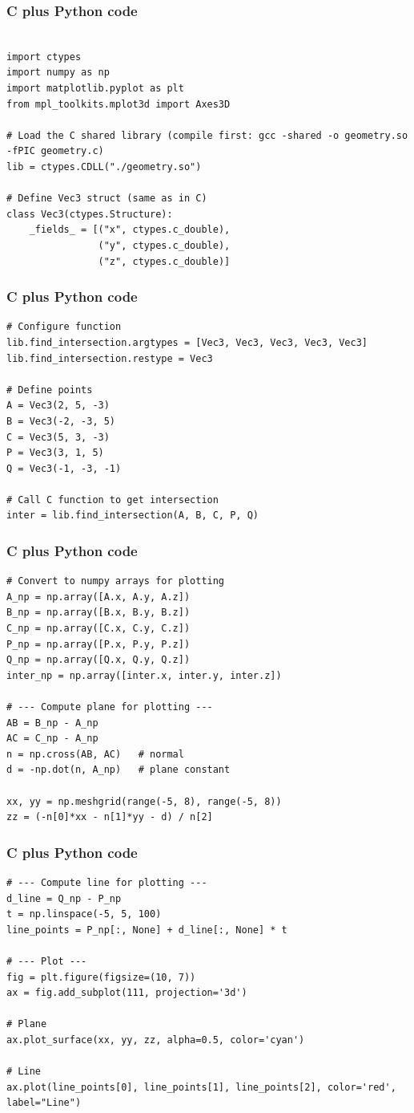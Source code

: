 \documentclass{beamer}
\begin{document}
\begin{frame}[fragile]
    \frametitle{C plus Python code}
    \begin{lstlisting}

import ctypes
import numpy as np
import matplotlib.pyplot as plt
from mpl_toolkits.mplot3d import Axes3D

# Load the C shared library (compile first: gcc -shared -o geometry.so -fPIC geometry.c)
lib = ctypes.CDLL("./geometry.so")

# Define Vec3 struct (same as in C)
class Vec3(ctypes.Structure):
    _fields_ = [("x", ctypes.c_double),
                ("y", ctypes.c_double),
                ("z", ctypes.c_double)]
\end{lstlisting}
 
\end{frame}
\begin{frame}[fragile]
    \frametitle{C plus Python code}
    \begin{lstlisting}
# Configure function
lib.find_intersection.argtypes = [Vec3, Vec3, Vec3, Vec3, Vec3]
lib.find_intersection.restype = Vec3

# Define points
A = Vec3(2, 5, -3)
B = Vec3(-2, -3, 5)
C = Vec3(5, 3, -3)
P = Vec3(3, 1, 5)
Q = Vec3(-1, -3, -1)

# Call C function to get intersection
inter = lib.find_intersection(A, B, C, P, Q)
\end{lstlisting}
 
\end{frame}
\begin{frame}[fragile]
    \frametitle{C plus Python code}
    \begin{lstlisting}
# Convert to numpy arrays for plotting
A_np = np.array([A.x, A.y, A.z])
B_np = np.array([B.x, B.y, B.z])
C_np = np.array([C.x, C.y, C.z])
P_np = np.array([P.x, P.y, P.z])
Q_np = np.array([Q.x, Q.y, Q.z])
inter_np = np.array([inter.x, inter.y, inter.z])

# --- Compute plane for plotting ---
AB = B_np - A_np
AC = C_np - A_np
n = np.cross(AB, AC)   # normal
d = -np.dot(n, A_np)   # plane constant

xx, yy = np.meshgrid(range(-5, 8), range(-5, 8))
zz = (-n[0]*xx - n[1]*yy - d) / n[2]
\end{lstlisting}
 
\end{frame}
\begin{frame}[fragile]
    \frametitle{C plus Python code}
    \begin{lstlisting}
# --- Compute line for plotting ---
d_line = Q_np - P_np
t = np.linspace(-5, 5, 100)
line_points = P_np[:, None] + d_line[:, None] * t

# --- Plot ---
fig = plt.figure(figsize=(10, 7))
ax = fig.add_subplot(111, projection='3d')

# Plane
ax.plot_surface(xx, yy, zz, alpha=0.5, color='cyan')

# Line
ax.plot(line_points[0], line_points[1], line_points[2], color='red', label="Line")
\end{lstlisting}
 
\end{frame}
\end{document}
